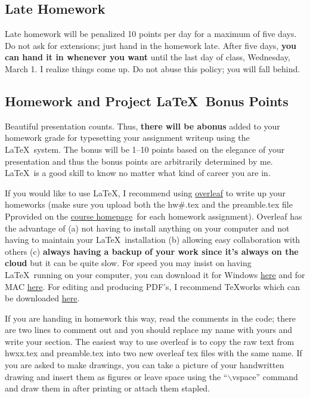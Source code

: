 \documentclass[12pt]{article}
\newcommand{\ingreen}[1]{\color{green}\textbf{#1} \color{black}}
\newcommand{\coursewebpage}{\href{https://github.com/kapelner/Wharton_Stat_422_722}{course homepage}}
\newcommand{\qu}[1]{``#1''}
\begin{document}
\subsection*{Late Homework}

Late homework will be penalized 10 points per day for a maximum of five days. Do not ask for extensions; just hand in the homework late. After five days, \textbf{you can hand it in whenever you want} until the last day of class, Wednesday, March 1. I realize things come up. Do not abuse this policy; you will fall behind.

\subsection*{Homework and Project \LaTeX~Bonus Points}

Beautiful presentation counts. Thus, \ingreen{there will be abonus} added to your homework grade for typesetting your assignment writeup using the \LaTeX ~system. The bonus will be  1--10 points based on the elegance of your presentation and thus the bonus points are arbitrarily determined by me. \LaTeX~is a good skill to know no matter what kind of career you are in.

If you would like to use \LaTeX, I recommend using \href{http://overleaf.com}{overleaf} to write up your homeworks (make sure you upload both the hw\#.tex and the preamble.tex file Pprovided on the \coursewebpage ~for each homework assignment). Overleaf has the advantage of (a) not having to install anything on your computer and not having to maintain your \LaTeX ~installation (b) allowing easy collaboration with others (c) \ingreen{always having a backup of your work since it's always on the cloud} but it can be quite slow. For speed you may insist on having \LaTeX ~running on your computer, you can download it for Windows \href{http://www.miktex.org/download}{here} and for MAC \href{http://www.tug.org/mactex/}{here}. For editing and producing PDF's, I recommend \TeX works which can be downloaded \href{http://www.tug.org/texworks/#Getting_TeXworks}{here}.

If you are handing in homework this way, read the comments in the code; there are two lines to comment out and you should replace my name with yours and write your section. The easiest way to use overleaf is to copy the raw text from hwxx.tex and preamble.tex into two new overleaf tex files with the same name. If you are asked to make drawings, you can take a picture of your handwritten drawing and insert them as figures or leave space using the \qu{$\backslash$vspace} command and draw them in after printing or attach them stapled.
\end{document}
